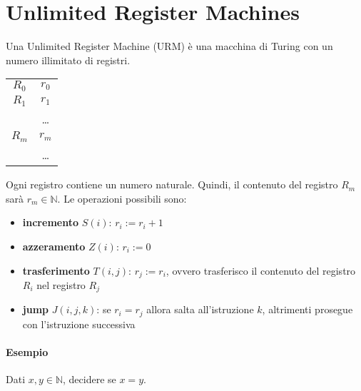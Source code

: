 \section{Unlimited Register Machines}
Una Unlimited Register Machine (URM) è una macchina di Turing con un numero illimitato di registri. 
\begin{table}[H]
    \centering
    \begin{tabular}{c|c|}
    \cline{2-2}
    $R_0$ & $r_0$ \\ \cline{2-2} 
    $R_1$ & $r_1$ \\ \cline{2-2} 
          & \dots \\ \cline{2-2} 
    $R_m$ & $r_m$ \\ \cline{2-2} 
          & \dots 
    \end{tabular}
\end{table}
Ogni registro contiene un numero naturale. Quindi, il contenuto del registro $R_m$ sarà $r_m\in\mathbb{N}$. Le operazioni possibili sono:
\begin{itemize}
    \item \textbf{incremento} $S(i)$: $r_i:=r_i+1$
    \item \textbf{azzeramento} $Z(i)$: $r_i:=0$
    \item \textbf{trasferimento} $T(i,j)$: $r_j:=r_i$, ovvero trasferisco il contenuto del registro $R_i$ nel registro $R_j$
    \item \textbf{jump} $J(i,j,k)$: se $r_i=r_j$ allora salta all'istruzione $k$, altrimenti prosegue con l'istruzione successiva
\end{itemize}



\paragraph{Esempio} Dati $x,y\in\mathbb{N}$, decidere se $x=y$.


